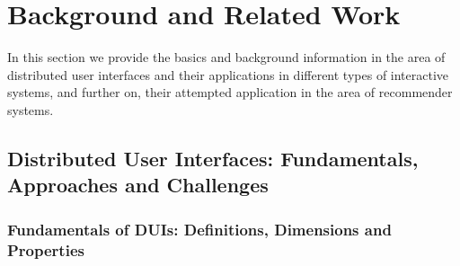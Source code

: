 \chapter{Background and Related Work}\label{chapter:litreview}
In this section we provide the basics and background information in the area of
distributed user interfaces and their applications in different types of
interactive systems, and further on, their attempted application in the area of
recommender systems.
\section{Distributed User Interfaces: Fundamentals, Approaches and Challenges}
\subsection{Fundamentals of DUIs: Definitions, Dimensions and Properties}
